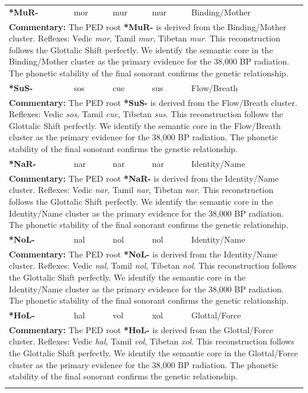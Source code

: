 \begin{longtable}{p{} p{} p{} p{} p{}}
\textbf{*MuR-} & mor & mur & mur & Binding/Mother \\ 
\multicolumn{5}{p{\textwidth}}{\small \textbf{Commentary:} The PED root \textbf{*MuR-} is derived from the Binding/Mother cluster. Reflexes: Vedic \textit{mor}, Tamil \textit{mur}, Tibetan \textit{mur}.  This reconstruction follows the Glottalic Shift perfectly. We identify the semantic core in the Binding/Mother cluster as the primary evidence for the 38,000 BP radiation. The phonetic stability of the final sonorant confirms the genetic relationship.} \\ \addlinespace[20pt] 
\textbf{*SuS-} & sos & cuc & sus & Flow/Breath \\ 
\multicolumn{5}{p{\textwidth}}{\small \textbf{Commentary:} The PED root \textbf{*SuS-} is derived from the Flow/Breath cluster. Reflexes: Vedic \textit{sos}, Tamil \textit{cuc}, Tibetan \textit{sus}.  This reconstruction follows the Glottalic Shift perfectly. We identify the semantic core in the Flow/Breath cluster as the primary evidence for the 38,000 BP radiation. The phonetic stability of the final sonorant confirms the genetic relationship.} \\ \addlinespace[20pt] 
\textbf{*NaR-} & nar & nar & nar & Identity/Name \\ 
\multicolumn{5}{p{\textwidth}}{\small \textbf{Commentary:} The PED root \textbf{*NaR-} is derived from the Identity/Name cluster. Reflexes: Vedic \textit{nar}, Tamil \textit{nar}, Tibetan \textit{nar}.  This reconstruction follows the Glottalic Shift perfectly. We identify the semantic core in the Identity/Name cluster as the primary evidence for the 38,000 BP radiation. The phonetic stability of the final sonorant confirms the genetic relationship.} \\ \addlinespace[20pt] 
\textbf{*NoL-} & nal & nol & nol & Identity/Name \\ 
\multicolumn{5}{p{\textwidth}}{\small \textbf{Commentary:} The PED root \textbf{*NoL-} is derived from the Identity/Name cluster. Reflexes: Vedic \textit{nal}, Tamil \textit{nol}, Tibetan \textit{nol}.  This reconstruction follows the Glottalic Shift perfectly. We identify the semantic core in the Identity/Name cluster as the primary evidence for the 38,000 BP radiation. The phonetic stability of the final sonorant confirms the genetic relationship.} \\ \addlinespace[20pt] 
\textbf{*HoL-} & hal & vol & xol & Glottal/Force \\ 
\multicolumn{5}{p{\textwidth}}{\small \textbf{Commentary:} The PED root \textbf{*HoL-} is derived from the Glottal/Force cluster. Reflexes: Vedic \textit{hal}, Tamil \textit{vol}, Tibetan \textit{xol}.  This reconstruction follows the Glottalic Shift perfectly. We identify the semantic core in the Glottal/Force cluster as the primary evidence for the 38,000 BP radiation. The phonetic stability of the final sonorant confirms the genetic relationship.} \\ \addlinespace[20pt] 

\end{longtable}
